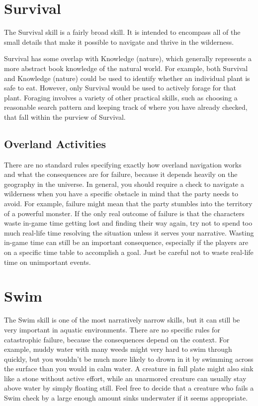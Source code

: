 \section{Survival}
  The Survival skill is a fairly broad skill.
  It is intended to encompass all of the small details that make it possible to navigate and thrive in the wilderness.

  Survival has some overlap with Knowledge (nature), which generally represents a more abstract book knowledge of the natural world.
  For example, both Survival and Knowledge (nature) could be used to identify whether an individual plant is safe to eat.
  However, only Survival would be used to actively forage for that plant.
  Foraging involves a variety of other practical skills, such as choosing a reasonable search pattern and keeping track of where you have already checked, that fall within the purview of Survival.

  \subsection{Overland Activities}
    There are no standard rules specifying exactly how overland navigation works and what the consequences are for failure, because it depends heavily on the geography in the universe.
    In general, you should require a check to navigate a wilderness when you have a specific obstacle in mind that the party needs to avoid.
    For example, failure might mean that the party stumbles into the territory of a powerful monster.
    If the only real outcome of failure is that the characters waste in-game time getting lost and finding their way again, try not to spend too much real-life time resolving the situation unless it serves your narrative.
    Wasting in-game time can still be an important consequence, especially if the players are on a specific time table to accomplish a goal.
    Just be careful not to waste real-life time on unimportant events.

\section{Swim}
  The Swim skill is one of the most narratively narrow skills, but it can still be very important in aquatic environments.
  There are no specific rules for catastrophic failure, because the consequences depend on the context.
  For example, muddy water with many weeds might very hard to swim through quickly, but you wouldn't be much more likely to drown in it by swimming across the surface than you would in calm water.
  A creature in full plate might also sink like a stone without active effort, while an unarmored creature can usually stay above water by simply floating still.
  Feel free to decide that a creature who fails a Swim check by a large enough amount sinks underwater if it seems appropriate.
